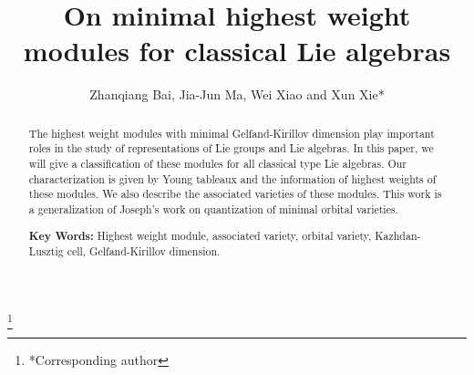 \documentclass{amsart}[12pt]
\numberwithin{equation}{section}
\begin{document}
\title[Mminimal highest weight modules]{On minimal highest weight modules for classical Lie algebras}

\author{ Zhanqiang Bai, Jia-Jun Ma, Wei Xiao and Xun Xie*}

\address[Bai]{School of Mathematical Sciences, Soochow University, Suzhou 215006, P. R. China}


\address[Ma]{School of Mathematical Sciences, Shanghai Jiao Tong University, 800 Dongchuan Rd Shanghai 200240, P. R. China}


\address[Xiao]{College of Mathematics and statistics, Shenzhen Key Laboratory of Advanced Machine Learning and Applications, Shenzhen University,
Shenzhen 518060, Guangdong, P. R. China}




\address[Xie]{School of Mathematics and Statistics, Beijing
Institute of Technology, Beijing 100081, P. R. China}
%
\thanks{*Corresponding author}



\date{}
\maketitle


\begin{abstract}
The highest weight modules with minimal Gelfand-Kirillov dimension play important roles in the study of representations of Lie groups and Lie algebras. In this paper, we will give a classification of these modules for all classical type Lie algebras. Our characterization is given by Young tableaux and the information of highest weights of these modules. We also describe the associated varieties of these modules. This work is a generalization of Joseph's work on quantization of minimal orbital varieties.




{\bf Key Words:} Highest weight module, associated variety, orbital variety, Kazhdan-Lusztig cell, Gelfand-Kirillov dimension.

\end{abstract}
\end{document}
